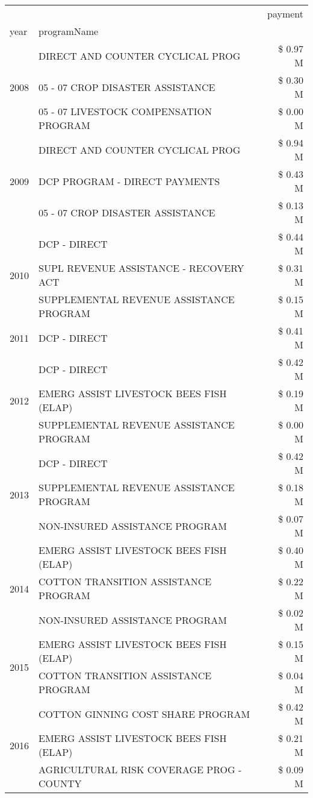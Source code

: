 \begin{tabular}{llr}
\toprule
 &  & payment \\
year & programName &  \\
\midrule
\multirow[t]{3}{*}{2008} & DIRECT AND COUNTER CYCLICAL PROG & \$ 0.97 M \\
 & 05 - 07 CROP DISASTER ASSISTANCE & \$ 0.30 M \\
 & 05 - 07 LIVESTOCK COMPENSATION PROGRAM & \$ 0.00 M \\
\cline{1-3}
\multirow[t]{3}{*}{2009} & DIRECT AND COUNTER CYCLICAL PROG & \$ 0.94 M \\
 & DCP PROGRAM - DIRECT PAYMENTS & \$ 0.43 M \\
 & 05 - 07 CROP DISASTER ASSISTANCE & \$ 0.13 M \\
\cline{1-3}
\multirow[t]{3}{*}{2010} & DCP - DIRECT & \$ 0.44 M \\
 & SUPL REVENUE ASSISTANCE - RECOVERY ACT & \$ 0.31 M \\
 & SUPPLEMENTAL REVENUE ASSISTANCE PROGRAM & \$ 0.15 M \\
\cline{1-3}
2011 & DCP - DIRECT & \$ 0.41 M \\
\cline{1-3}
\multirow[t]{3}{*}{2012} & DCP - DIRECT & \$ 0.42 M \\
 & EMERG ASSIST LIVESTOCK BEES FISH (ELAP) & \$ 0.19 M \\
 & SUPPLEMENTAL REVENUE ASSISTANCE PROGRAM & \$ 0.00 M \\
\cline{1-3}
\multirow[t]{3}{*}{2013} & DCP - DIRECT & \$ 0.42 M \\
 & SUPPLEMENTAL REVENUE ASSISTANCE PROGRAM & \$ 0.18 M \\
 & NON-INSURED ASSISTANCE PROGRAM & \$ 0.07 M \\
\cline{1-3}
\multirow[t]{3}{*}{2014} & EMERG ASSIST LIVESTOCK BEES FISH (ELAP) & \$ 0.40 M \\
 & COTTON TRANSITION ASSISTANCE PROGRAM & \$ 0.22 M \\
 & NON-INSURED ASSISTANCE PROGRAM & \$ 0.02 M \\
\cline{1-3}
\multirow[t]{2}{*}{2015} & EMERG ASSIST LIVESTOCK BEES FISH (ELAP) & \$ 0.15 M \\
 & COTTON TRANSITION ASSISTANCE PROGRAM & \$ 0.04 M \\
\cline{1-3}
\multirow[t]{3}{*}{2016} & COTTON GINNING COST SHARE PROGRAM & \$ 0.42 M \\
 & EMERG ASSIST LIVESTOCK BEES FISH (ELAP) & \$ 0.21 M \\
 & AGRICULTURAL RISK COVERAGE PROG - COUNTY & \$ 0.09 M \\

\end{tabular}
